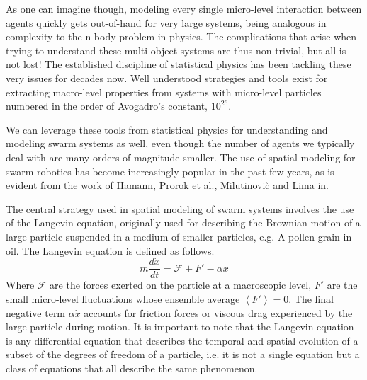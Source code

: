 \documentclass[11pt, onecolumn, compsoc, letterpaper]{article}
\begin{document}
As one can imagine though, modeling every single micro-level interaction between agents quickly gets out-of-hand for very large systems, being analogous in complexity to the n-body problem in physics. The complications that arise when trying to understand these multi-object systems are thus non-trivial, but all is not lost! The established discipline of statistical physics has been tackling these very issues for decades now. Well understood strategies and tools exist for extracting macro-level properties from systems with micro-level particles numbered in the order of Avogadro's constant, $10^{26}$.

We can leverage these tools from statistical physics for understanding and modeling swarm systems as well, even though the number of agents we typically deal with are many orders of magnitude smaller. The use of spatial modeling for swarm robotics has become increasingly popular in the past few years, as is evident from the work of Hamann\cite{Hamann2008, Hamann2010}, Prorok et al.\cite{Prorok2011}, Milutinovi\`{c} and Lima in\cite{Milutinovi2006}.

The central strategy used in spatial modeling of swarm systems involves the use of the Langevin equation, originally used for describing the Brownian motion of a large particle suspended in a medium of smaller particles, e.g. A pollen grain in oil. The Langevin equation is defined as follows\cite{Reif1965}.
\begin{equation}
	m \frac{d\dot{x}}{dt} = \mathcal{F} + F' - \alpha\dot{x}
\end{equation}
Where $\mathcal{F}$ are the forces exerted on the particle at a macroscopic level, $F'$ are the small micro-level fluctuations whose ensemble average $\left<F'\right> = 0$. The final negative term $\alpha\dot{x}$ accounts for friction forces or viscous drag experienced by the large particle during motion. It is important to note that the Langevin equation is any differential equation that describes the temporal and spatial evolution of a subset of the degrees of freedom of a particle, i.e. it is not a single equation but a class of equations that all describe the same phenomenon. 
\end{document}
